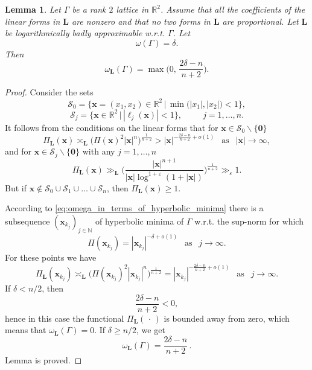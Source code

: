 \documentclass[a4paper,12pt]{article}
\theoremstyle{definition}
\theoremstyle{remark}
\theoremstyle{plain}
\newtheorem{lemma}{Lemma}
\renewcommand{\vec}[1]{\mathbf{#1}}
\renewcommand{\geq}{\geqslant}
\newcommand{\e}{\varepsilon}
\newcommand{\R}{\mathbb{R}}
\newcommand{\N}{\mathbb{N}}
\newcommand{\Ga}{\Gamma}
\newcommand{\cS}{\mathcal{S}}
\newcommand{\bL}{\mathbf{L}}
\begin{document}
\begin{lemma}\label{l:from_omega_to_omega_L}
   Let $\Ga$ be a rank $2$ lattice in $\R^2$. Assume that all the coefficients of the linear forms in $\bL$ are nonzero and that no two forms in $\bL$ are proportional. Let $\bL$ be logarithmically badly approximable w.r.t. $\Ga$. Let
  \[
    \omega(\Ga)=\delta.
  \]
  Then
  \[
    \omega_\bL(\Ga)=
    \max\bigg(0,\,\dfrac{2\delta-n}{n+2}\bigg).
  \]
\end{lemma}

\begin{proof}
  Consider the sets
  \begin{equation}\label{eq:S_0}
    \cS_0=\Big\{ \vec x=(x_1,x_2)\in\R^2 \,\Big|\, \min\big(|x_1|,|x_2|\big)<1 \Big\},
  \end{equation}
  \begin{equation}\label{eq:S_j}
    \cS_j=\Big\{ \vec x\in\R^2 \,\Big|\, |\ell_j(\vec x)|<1 \Big\},\qquad\ \ j=1,\ldots,n.
  \end{equation}
  It follows from the conditions on the linear forms that for $\vec x\in\cS_0\backslash\{\vec 0\}$
  \[
    \Pi_\bL(\vec x)\asymp_\bL
    \Big(\Pi(\vec x)^2|\vec x|^n\Big)^{\frac1{n+2}}>
    |\vec x|^{-\frac{2\delta-n}{n+2}+o(1)}
    \ \ \text{ as }\ \ |\vec x|\to\infty,
  \]
  and for $\vec x\in\cS_j\backslash\{\vec 0\}$ with any $j=1,\ldots,n$
  \[
    \Pi_\bL(\vec x)\gg_\bL
    \bigg(\frac{|\vec x|^{n+1}}{|\vec x|\log^{1+\e}(1+|\vec x|)}\bigg)^{\frac1{n+2}}\gg_\e1.
  \]
  But if $\vec x\notin\cS_0\cup\cS_1\cup\ldots\cup\cS_n$, then $\Pi_\bL(\vec x)\geq1$. 
  
  According to \eqref{eq:omega_in_terms_of_hyperbolic_minima} there is a subsequence $(\vec x_{k_j})_{j\in\N}$ of hyperbolic minima of $\Ga$ w.r.t. the sup-norm for which
  \[
    \Pi(\vec x_{k_j})=|\vec x_{k_j}|^{-\delta+o(1)}
    \ \ \text{ as }\ \ j\to\infty.
  \]
  For these points we have
  \[
    \Pi_\bL(\vec x_{k_j})\asymp_\bL
    \Big(\Pi(\vec x_{k_j})^2|\vec x_{k_j}|^n\Big)^{\frac1{n+2}}=|\vec x_{k_j}|^{-\frac{2\delta-n}{n+2}+o(1)}
    \ \ \text{ as }\ \ j\to\infty.
  \]
  If $\delta<n/2$, then
  \[
    \frac{2\delta-n}{n+2}<0,
  \]
  hence in this case the functional $\Pi_\bL(\,\cdot\,)$ is bounded away from zero, which means that $\omega_\bL(\Ga)=0$. If $\delta\geq n/2$, we get
  \[
    \omega_\bL(\Ga)=\frac{2\delta-n}{n+2}\,.
  \]
  Lemma is proved.
\end{proof}
\end{document}
